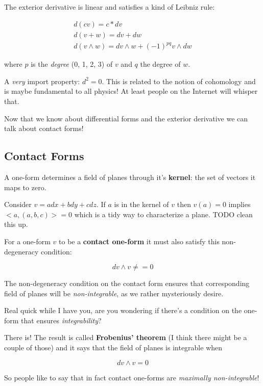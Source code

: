 \documentclass{article}
\begin{document}
The exterior derivative is linear and satisfies a kind of Leibniz rule:

\begin{gather*}
  d(cv) = c * dv \\
  d(v + w) = dv + dw \\
  d(v \wedge w) = dv \wedge w + (-1)^{pq} v \wedge dw
\end{gather*}

where $p$ is the \textit{degree} (0, 1, 2, 3) of $v$ and $q$ the degree of $w$.

A \textit{very} import property: $d^{2} = 0$. This is related to the notion of
cohomology and is maybe fundamental to all physics! At least people on the
Internet will whisper that.

Now that we know about differential forms and the exterior derivative we can
talk about contact forms!

\subsection {Contact Forms}

A one-form determines a field of planes through it's \textbf{kernel}: the set of
vectors it maps to zero.

Consider $v = a dx + b dy + c dz$. If $a$ is in the kernel of $v$ then $v(a) =
0$ implies $<a, (a, b, c)> = 0$ which is a tidy way to characterize a plane.
TODO clean this up.

For a one-form $v$ to be a \textbf{contact one-form} it must also satisfy this
non-degeneracy condition:

\begin{equation}
  dv \wedge v \neq = 0
\end{equation}

The non-degeneracy condition on the contact form ensures that corresponding
field of planes will be \textit{non-integrable}, as we rather mysteriously
desire.

Real quick while I have you, are you wondering if there's a condition on the
one-form that ensures \textit{integrability}?

There is! The result is called \textbf{Frobenius' theorem} (I think there might
be a couple of those) and it says that the field of planes is integrable when

\begin{equation}
  dv \wedge v = 0
\end{equation}

So people like to say that in fact contact one-forms are \textit{maximally non-integrable}!
\end{document}
